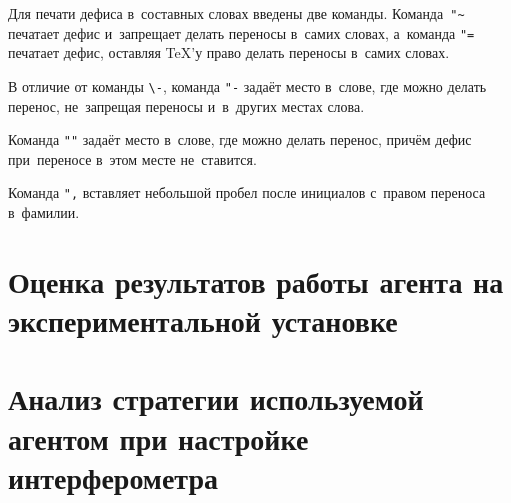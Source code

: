 Для печати дефиса в~составных словах введены две команды. Команда~\verb|"~|
печатает дефис и~запрещает делать переносы в~самих словах, а~команда \verb|"=|
печатает дефис, оставляя \TeX ’у право делать переносы в~самих словах.

В отличие от команды \verb|\-|, команда \verb|"-| задаёт место в~слове, где
можно делать перенос, не~запрещая переносы и~в~других местах слова.

Команда \verb|""| задаёт место в~слове, где можно делать перенос, причём дефис
при~переносе в~этом месте не~ставится.

Команда \verb|",| вставляет небольшой пробел после инициалов с~правом переноса
в~фамилии.

\section{Оценка результатов работы агента на экспериментальной установке}

\section{Анализ стратегии используемой агентом при настройке интерферометра}

